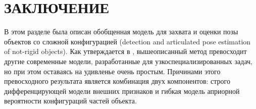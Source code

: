 \section*{ЗАКЛЮЧЕНИЕ}

В этом разделе была описан обобщенная модель для захвата и оценки позы объектов со сложной конфигурацией (detection and articulated pose estimation of not-rigid objects). Как утверждается в \cite{andriluka09}, вышеописанный метод превосходит другие современные модели, разработанные для узкоспециализированных задач, но при этом оставаясь на удивленье очень простым. Причинами этого превосходного результата является комбинация двух компонентов: строго дифференцирующей модели внешних признаков и гибкая модель априорной вероятности конфигураций частей объекта.

\newpage

